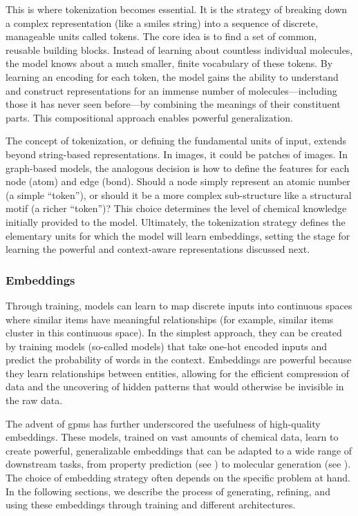 This is where tokenization becomes essential. 
It is the strategy of breaking down a complex representation (like a \gls{smiles} string) into a sequence of discrete, manageable units called tokens. The core idea is to find a set of common, reusable building blocks. Instead of learning about countless individual molecules, the model knows about a much smaller, finite vocabulary of these tokens. By learning an encoding for each token, the model gains the ability to understand and construct representations for an immense number of molecules---including those it has never seen before---by combining the meanings of their constituent parts. 
This compositional approach enables powerful generalization.

The concept of tokenization, or defining the fundamental units of input, extends beyond string-based representations. 
In images, it could be patches of images. 
In graph-based models, the analogous decision is how to define the features for each node (atom) and edge (bond). 
Should a node simply represent an atomic number (a simple \enquote{token}), or should it be a more complex sub-structure like a structural motif\autocite{bouritsas2022improving} (a richer \enquote{token})? This choice determines the level of chemical knowledge initially provided to the model. 
Ultimately, the tokenization strategy defines the elementary units for which the model will learn embeddings, setting the stage for learning the powerful and context-aware representations discussed next.


\subsubsection{Embeddings} \label{sec:embeddings}

Through training, models can learn to map discrete inputs into continuous spaces where similar items have meaningful relationships (for example, similar items cluster in this continuous space). 
In the simplest approach, they can be created by training models (so-called  models) that take one-hot encoded inputs and predict the probability of words in the context.\autocite{mikolov2013efficient, mikolov2013distributed, Tshitoyan_2019}
Embeddings are powerful because they learn relationships between entities, allowing for the efficient compression of data and the uncovering of hidden patterns that would otherwise be invisible in the raw data.

The advent of \glspl{gpm} has further underscored the usefulness of high-quality embeddings. 
These models, trained on vast amounts of chemical data, learn to create powerful, generalizable embeddings that can be adapted to a wide range of downstream tasks, from property prediction (see ) to molecular generation (see ). 
The choice of embedding strategy often depends on the specific problem at hand. 
In the following sections, we describe the process of generating, refining, and using these embeddings through training and different architectures.


